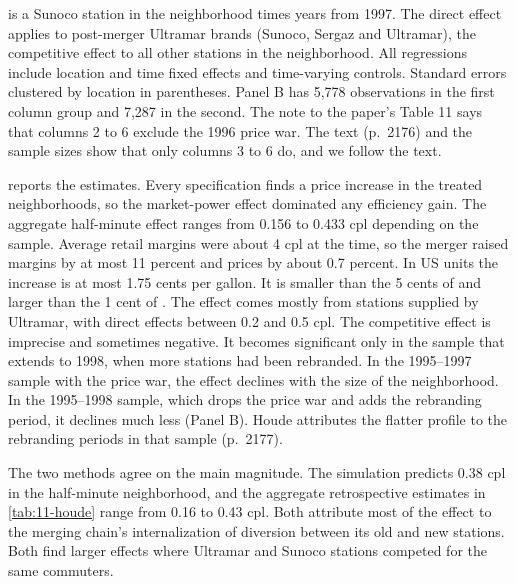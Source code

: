\begin{table}[htbp]
\begin{threeparttable}
\begin{tablenotes}[flushleft]
is a Sunoco station in the neighborhood times years from 1997. The direct effect applies to post-merger Ultramar brands
(Sunoco, Sergaz and Ultramar), the competitive effect to all other stations in the neighborhood. All regressions
include location and time fixed effects and time-varying controls. Standard errors clustered by location in
parentheses. Panel B has 5,778 observations in the first column group and 7,287 in the second. The note to the paper's
Table 11 says that columns 2 to 6 exclude the 1996 price war. The text (p.~2176) and the sample sizes show that only
columns 3 to 6 do, and we follow the text.
\end{tablenotes}
\end{threeparttable}
\end{table}

 reports the estimates. Every specification finds a price increase in the treated neighborhoods,
so the market-power effect dominated any efficiency gain. The aggregate half-minute effect ranges from 0.156 to 0.433
cpl depending on the sample. Average retail margins were about 4 cpl at the time, so the merger raised margins by at
most 11 percent and prices by about 0.7 percent. In US units the increase is at most 1.75 cents per gallon. It is
smaller than the 5 cents of \citet{Hastings2004} and larger than the 1 cent of \citet{TaylorKreisleZimmerman2010}
\citep[p.~2176]{Houde2012}. The effect comes mostly from stations supplied by Ultramar, with direct
effects between 0.2 and 0.5 cpl. The competitive effect is imprecise and sometimes negative. It becomes significant
only in the sample that extends to 1998, when more stations had been rebranded. In the 1995--1997 sample with the price war, the effect declines with the size of
the neighborhood. In the 1995--1998 sample, which drops the price war and adds the rebranding period, it declines
much less (Panel B). Houde attributes the flatter profile to the rebranding periods in that sample (p.~2177).

The two methods agree on the main magnitude. The simulation predicts 0.38 cpl in the half-minute neighborhood, and
the aggregate retrospective estimates in \cref{tab:11-houde} range from 0.16 to 0.43 cpl. Both attribute most of the effect to the merging chain's
internalization of diversion between its old and new stations. Both find larger effects where Ultramar and Sunoco
stations competed for the same commuters.

